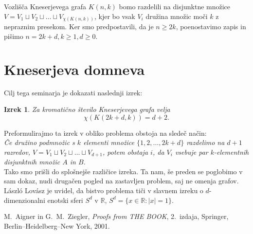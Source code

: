 \documentclass[a4paper,12pt]{article}
\newtheorem{izrek}{Izrek}
\begin{document}
Vozlišča Kneserjevega grafa $K(n,k)$ bomo razdelili na disjunktne množice $V = V_1 \sqcup V_2 \sqcup \ldots \sqcup V_{\chi(K(n,k))}$, kjer bo vsak $V_i$ družina množic moči $k$ z nepraznim presekom. Ker smo predpostavili, da je $n \geq 2k$, poenostavimo zapis in pišimo $n = 2k + d, k \geq 1, d \geq 0$.

\section{Kneserjeva domneva}

Cilj tega seminarja je dokazati naslednji izrek: \\

\begin{izrek}%
Za kromatično število Kneserjevega grafa velja
$$\chi(K(2k+d,k)) = d+2.$$
\end{izrek}

\noindent
Preformulirajmo ta izrek v obliko problema obstoja na sledeč način: \\

\noindent
{\em Če družino podmnožic s $k$ elementi množice $\{1, 2, \ldots, 2k+d\}$ razdelimo na $d+1$ razredov,  $V = V_1 \sqcup V_2 \sqcup \ldots \sqcup V_{d+1}$, potem obstaja $i$, da $V_i$ vsebuje par $k$-elementnih disjunktnih množic $A$ in $B$.} \\

Tako smo prišli do splošnejše različice izreka. Ta nam, še preden se poglobimo v sam dokaz, nudi drugačen pogled na zastavljen problem, saj ne omenja grafov. László Lovász je uvidel, da bistvo problema tiči v slavnem izreku o $d$-dimenzionalni enotski sferi $S^d$ v $\mathbb{R}$, $S^d = \{x \in \mathbb{R}: |x|=1\}$.

\begin{thebibliography}{1}

M.~Aigner in G.~M.~Ziegler, \emph{Proofs from THE BOOK}, 2.\ izdaja, Springer, Berlin--Heidelberg--New York, 2001.

\end{thebibliography}
\end{document}
